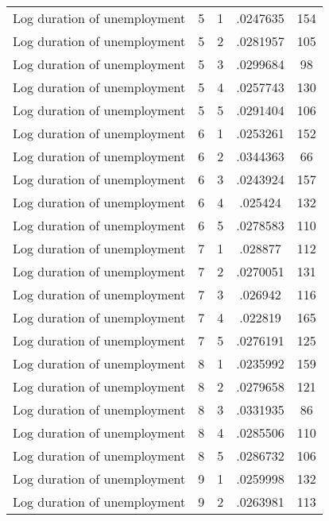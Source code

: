\begin{tabular}{l*{4}{c}}
Log duration of unemployment&           5&           1&    .0247635&         154\\
Log duration of unemployment&           5&           2&    .0281957&         105\\
Log duration of unemployment&           5&           3&    .0299684&          98\\
Log duration of unemployment&           5&           4&    .0257743&         130\\
Log duration of unemployment&           5&           5&    .0291404&         106\\
Log duration of unemployment&           6&           1&    .0253261&         152\\
Log duration of unemployment&           6&           2&    .0344363&          66\\
Log duration of unemployment&           6&           3&    .0243924&         157\\
Log duration of unemployment&           6&           4&     .025424&         132\\
Log duration of unemployment&           6&           5&    .0278583&         110\\
Log duration of unemployment&           7&           1&     .028877&         112\\
Log duration of unemployment&           7&           2&    .0270051&         131\\
Log duration of unemployment&           7&           3&     .026942&         116\\
Log duration of unemployment&           7&           4&     .022819&         165\\
Log duration of unemployment&           7&           5&    .0276191&         125\\
Log duration of unemployment&           8&           1&    .0235992&         159\\
Log duration of unemployment&           8&           2&    .0279658&         121\\
Log duration of unemployment&           8&           3&    .0331935&          86\\
Log duration of unemployment&           8&           4&    .0285506&         110\\
Log duration of unemployment&           8&           5&    .0286732&         106\\
Log duration of unemployment&           9&           1&    .0259998&         132\\
Log duration of unemployment&           9&           2&    .0263981&         113\\

\end{tabular}
